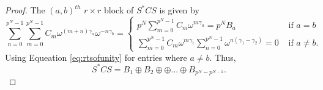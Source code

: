 \documentclass[preprint,12pt]{elsarticle}
\theoremstyle{definition}
\theoremstyle{remark}
\begin{document}
\begin{proof}
The $ (a,b)^{th} $ $r\times r$ block of $ S^*CS$ is given by 
\[
 {\sum\limits_{n = 0}^{{p^N} - 1} {\sum\limits_{m = 0}^{{p^N} - 1} {{C_m}{\omega ^{(m + n){\gamma _a}}}{\omega ^{ - n{\gamma _b}}}} } } %
 =\left\{ \begin{array}{cl}
 {{p^N}\sum\limits_{m = 0}^{{p^N} - 1} {{C_m}{\omega ^{m{\gamma _a}}}} }=p^NB_a& \text{ if }a=  b\\
 {\sum\limits_{m = 0}^{{p^N} - 1} {{C_m}{\omega ^{m{\gamma _1}}}\sum\limits_{n = 0}^{{p^N} - 1} {{\omega ^{n({\gamma _1} - {\gamma _2})}}} } }=0 & \text{ if } a \neq b. 
 \end{array} \right.
 \]
Using Equeation \ref{eq:rtsofunity} for entries where $a\neq b$. Thus, 
\[
{S^*}CS = B_1 \oplus B_2 \oplus \oplus \ldots \oplus B_{p^N-p^{N-1}}.
\]
\end{proof}
\end{document}
